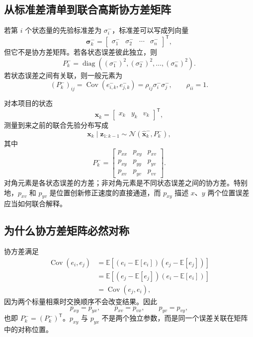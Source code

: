 \documentclass[UTF8,a4paper,11pt]{ctexart}
\newcommand{\prior}{^{-}}
\newcommand{\transpose}{^{\mathsf T}}
\begin{document}
\subsection{从标准差清单到联合高斯协方差矩阵}

若第 $i$ 个状态量的先验标准差为 $\sigma_i\prior$，标准差可以写成列向量
\begin{equation}
\bm\sigma_k\prior=
\begin{bmatrix}
\sigma_1\prior&\sigma_2\prior&\cdots&\sigma_n\prior
\end{bmatrix}\transpose,
\end{equation}
但它不是协方差矩阵。若各状态误差彼此独立，则
\begin{equation}
P_k\prior=\operatorname{diag}\!\left(
(\sigma_1\prior)^2,(\sigma_2\prior)^2,\ldots,(\sigma_n\prior)^2
\right).
\end{equation}
若状态误差之间有关联，则一般元素为
\begin{equation}
(P_k\prior)_{ij}
=\operatorname{Cov}(e_{i,k}\prior,e_{j,k}\prior)
=\rho_{ij}\sigma_i\prior\sigma_j\prior,
\qquad \rho_{ii}=1.
\end{equation}

对本项目的状态
\begin{equation}
\bm x_k=
\begin{bmatrix}x_k&y_k&v_k\end{bmatrix}\transpose,
\end{equation}
测量到来之前的联合先验分布写成
\begin{equation}
\bm x_k\mid\bm z_{1:k-1}
\sim\mathcal N(\hat{\bm x}_k\prior,P_k\prior),
\end{equation}
其中
\begin{equation}
P_k\prior=
\begin{bmatrix}
p_{xx}&p_{xy}&p_{xv}\\
p_{xy}&p_{yy}&p_{yv}\\
p_{xv}&p_{yv}&p_{vv}
\end{bmatrix}.
\end{equation}
对角元素是各状态误差的方差；非对角元素是不同状态误差之间的协方差。特别地，$p_{xv}$ 和 $p_{yv}$ 是位置创新修正速度的直接通道，而 $p_{xy}$ 描述 $x$、$y$ 两个位置误差应当如何联合解释。

\subsection{为什么协方差矩阵必然对称}

协方差满足
\begin{align}
\operatorname{Cov}(e_i,e_j)
&=\mathbb E[(e_i-\mathbb E[e_i])(e_j-\mathbb E[e_j])]\\
&=\mathbb E[(e_j-\mathbb E[e_j])(e_i-\mathbb E[e_i])]\\
&=\operatorname{Cov}(e_j,e_i),
\end{align}
因为两个标量相乘时交换顺序不会改变结果。因此
\begin{equation}
\boxed{p_{xy}=p_{yx},\qquad p_{xv}=p_{vx},\qquad p_{yv}=p_{vy}},
\end{equation}
也即 $P_k\prior=(P_k\prior)\transpose$。$p_{xy}$ 与 $p_{yx}$ 不是两个独立参数，而是同一个误差关联在矩阵中的对称位置。
\end{document}
